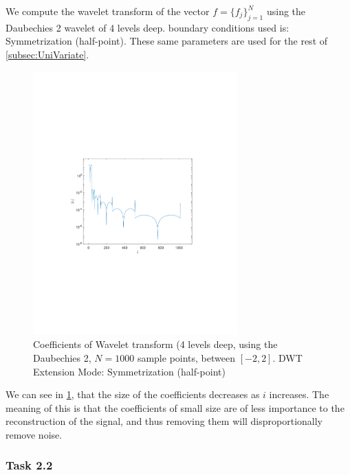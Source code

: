 \documentclass[a4paper]{article}
\begin{document}
    We compute the wavelet transform of the vector $f = \{f_j\}_{j=1}^N$ using the Daubechies 2 wavelet of 4 levels deep. boundary conditions used is: Symmetrization (half-point). These same parameters are used for the rest of \cref{subsec:UniVariate}.
    \begin{figure}[H]
	\centering
	\includegraphics[trim={3.5cm 8cm 4cm 9cm},clip,width=0.7\textwidth]{Images/Coefficents.pdf}
	\caption{Coefficients of Wavelet transform (4 levels deep, using the Daubechies 2, $N=1000$ sample points, between $[-2,2]$. DWT Extension Mode: Symmetrization (half-point)}
	\label{fig:Coeff}
    \end{figure}

    We can see in \cref{fig:Coeff}, that the size of the coefficients decreases as $i$ increases. The meaning of this is that the coefficients of small size are of less importance to the reconstruction of the signal, and thus removing them will disproportionally remove noise.

    \subsubsection{Task 2.2}
\end{document}
